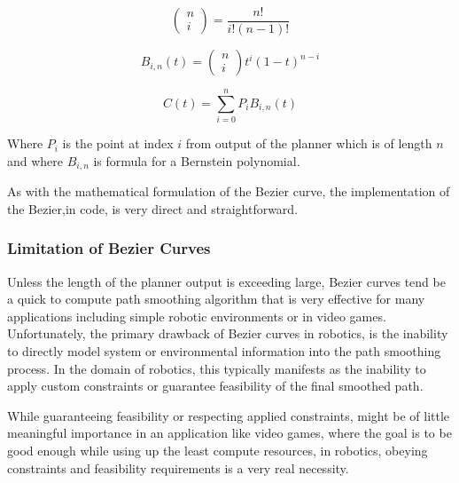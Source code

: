 \begin{equation}
    \left(\begin{array}{l}
    n \\
    i
    \end{array}\right)=\frac{n !}{i !(n-1) !}
\end{equation}

\begin{equation}
    B_{i, n}(t)=\left(\begin{array}{c}
    n \\
    i
    \end{array}\right) t^i(1-t)^{n-i}
\end{equation}

\begin{equation}
    C(t)=\sum_{i=0}^n P_i B_{i, n}(t)
\end{equation}

Where $P_i$ is the point at index $i$ from output of the planner which is of length $n$ and where $B_{i, n}$ is formula for a Bernstein polynomial. 

As with the mathematical formulation of the Bezier curve, the implementation of the Bezier,in code, is very direct and straightforward. 



\subsubsection{Limitation of Bezier Curves}
Unless the length of the planner output is exceeding large, Bezier curves tend be a quick to compute path smoothing algorithm that is very effective for many applications including simple robotic environments or in video games. Unfortunately, the primary drawback of Bezier curves in robotics, is the inability to directly model system or environmental information into the path smoothing process. In the domain of robotics, this typically manifests as the inability to apply custom constraints or guarantee feasibility of the final smoothed path.  

While guaranteeing feasibility or respecting applied constraints, might be of little meaningful importance in an application like video games, where the goal is to be good enough while using up the least compute resources, in robotics, obeying constraints and feasibility requirements is a very real necessity.

